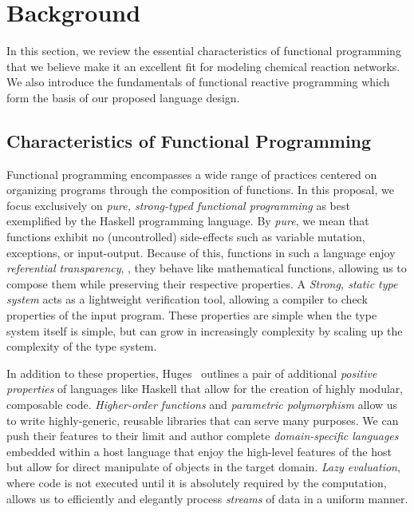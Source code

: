 
\section{Background}
\label{sec:frp_background}

In this section, we review the essential characteristics of functional programming that we believe make it an excellent fit for modeling chemical reaction networks.
We also introduce the fundamentals of functional reactive programming which form the basis of our proposed language design.

\subsection{Characteristics of Functional Programming}

Functional programming encompasses a wide range of practices centered on organizing programs through the composition of functions.
In this proposal, we focus exclusively on \emph{pure, strong-typed functional programming} as best exemplified by the Haskell programming language.
By \emph{pure}, we mean that functions exhibit no (uncontrolled) side-effects such as variable mutation, exceptions, or input-output.
Because of this, functions in such a language enjoy \emph{referential transparency}, \ie, they behave like mathematical functions, allowing us to compose them while preserving their respective properties.
A \emph{Strong, static type system} acts as a lightweight verification tool, allowing a compiler to check properties of the input program.
These properties are simple when the type system itself is simple, but can grow in increasingly complexity by scaling up the complexity of the type system.

In addition to these properties, Huges~\cite{huges:1990} outlines a pair of additional \emph{positive properties} of languages like Haskell that allow for the creation of highly modular, composable code.
\emph{Higher-order functions} and \emph{parametric polymorphism} allow us to write highly-generic, reusable libraries that can serve many purposes.
We can push their features to their limit and author complete \emph{domain-specific languages} embedded within a host language that enjoy the high-level features of the host but allow for direct manipulate of objects in the target domain.
\emph{Lazy evaluation}, where code is not executed until it is absolutely required by the computation, allows us to efficiently and elegantly process \emph{streams} of data in a uniform manner.

